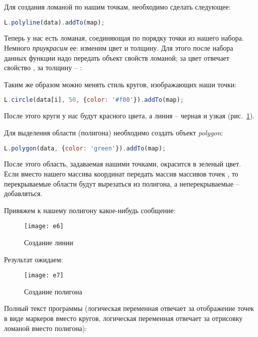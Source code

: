 Для создания ломаной по нашим точкам, необходимо сделать следующее:
\begin{lstlisting}[language=js]
    L.polyline(data).addTo(map);
\end{lstlisting}

Теперь у нас есть ломаная, соединяющая по порядку точки из нашего набора. 
Немного \emph{приукрасим} ее: изменим цвет и толщину. Для этого после набора 
данных  функции надо передать объект свойств ломаной; за цвет отвечает 
свойство , за толщину -- :


Таким же образом можно менять стиль кругов, изображающих наши точки:
\begin{lstlisting}[language=js]
    L.circle(data[i], 50, {color: '#f00'}).addTo(map);
\end{lstlisting}

После этого круги у нас будут красного цвета, а линия -- черная и узкая
(рис.~\ref{pic:e6}).

Для выделения области (полигона) необходимо создать объект \emph{polygon}:
\begin{lstlisting}[language=js]
    L.polygon(data, {color: 'green'}).addTo(map);
\end{lstlisting}
После этого область, задаваемая нашими точками, окрасится в зеленый цвет.
Если вместо нашего массива координат  передать массив массивов
точек , то перекрываемые области будут
вырезаться из полигона, а неперекрываемые -- добавляться.

Привяжем к нашему полигону какое-нибудь сообщение:


\newpage

\begin{figure}[ht!]
    \center
    \texttt{[image: e6]}
    \caption{Создание линии}
    \label{pic:e6}
\end{figure}

Результат ожидаем:
\begin{figure}[h!]
    \center
    \texttt{[image: e7]}
    \caption{Создание полигона}
    \label{pic:e7}
\end{figure}

Полный текст программы (логическая переменная  отвечает за 
отображение точек в виде маркеров вместо кругов, логическая переменная 
 отвечает за отрисовку ломаной вместо полигона):


